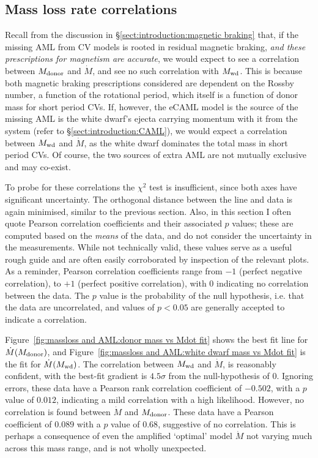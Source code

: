 \begin{figure}
    \label{fig:massloss and AML:compare Mdot from donor and WD}
\end{figure}


\subsection{Mass loss rate correlations}
\label{sect:massloss and AML:mass loss rate correlations}

Recall from the discussion in \S\ref{sect:introduction:magnetic braking} that, if the missing AML from CV models is rooted in residual magnetic braking, \textit{and these prescriptions for magnetism are accurate}, we would expect to see a correlation between $M_{\rm donor}$ and $\dot M$, and see no such correlation with $M_{\rm wd}$.
This is because both magnetic braking prescriptions considered are dependent on the Rossby number, a function of the rotational period, which itself is a function of donor mass for short period CVs.
If, however, the eCAML model is the source of the missing AML is the white dwarf's ejecta carrying momentum with it from the system (refer to \S\ref{sect:introduction:CAML}), we would expect a correlation between $M_{\rm wd}$ and $\dot M$, as the white dwarf dominates the total mass in short period CVs.
Of course, the two sources of extra AML are not mutually exclusive and may co-exist.

To probe for these correlations the $\chi^2$ test is insufficient, since both axes have significant uncertainty. The orthogonal distance between the line and data is again minimised, similar to the previous section.
Also, in this section I often quote Pearson correlation coefficients and their associated $p$ values; these are computed based on the \textit{means} of the data, and do not consider the uncertainty in the measurements. While not technically valid, these values serve as a useful rough guide and are often easily corroborated by inspection of the relevant plots. As a reminder, Pearson correlation coefficients range from $-1$ (perfect negative correlation), to $+1$ (perfect positive correlation), with 0 indicating no correlation between the data. The $p$ value is the probability of the null hypothesis, i.e. that the data are uncorrelated, and values of $p < 0.05$ are generally accepted to indicate a correlation.

Figure~\ref{fig:massloss and AML:donor mass vs Mdot fit} shows the best fit line for $\dot M(M_{\rm donor})$, and Figure~\ref{fig:massloss and AML:white dwarf mass vs Mdot fit} is the fit for $\dot M(M_{\rm wd})$.
The correlation between $M_{\rm wd}$ and $\dot M$, is reasonably confident, with the best-fit gradient is $4.5\sigma$ from the null-hypothesis of 0. Ignoring errors, these data have a Pearson rank correlation coefficient of $-0.502$, with a $p$ value of $0.012$, indicating a mild correlation with a high likelihood.
However, no correlation is found between $\dot M$ and $M_{\rm donor}$. These data have a Pearson coefficient of $0.089$ with a $p$ value of $0.68$, suggestive of no correlation.
This is perhaps a consequence of even the amplified `optimal' model $\dot M$ not varying much across this mass range, and is not wholly unexpected.

